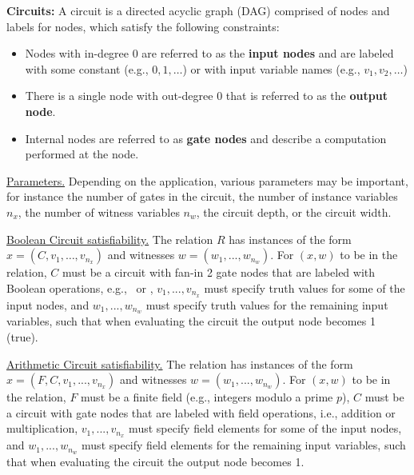 \textbf{Circuits:} A circuit is a directed acyclic graph (DAG) comprised of nodes and labels for nodes, which satisfy the following constraints:
\begin{itemize}
\item Nodes with in-degree 0 are referred to as the \textbf{input nodes} and are labeled with some constant (e.g., $0, 1, \ldots$) or with input variable names (e.g., $v_1, v_2, \ldots$)
\item There is a single node with out-degree 0 that is referred to as the \textbf{output node}.
\item Internal nodes %
are 
referred to as \textbf{gate nodes} and %
describe a computation %
performed at the node.\loosen
\end{itemize}


\underline{Parameters.} Depending on the application, various parameters may be important, for instance the number of gates in the circuit, the number of instance variables $n_x$, the number of witness variables $n_w$, the circuit depth, or the circuit width.
 
\underline{Boolean Circuit satisfiability.} 
	The relation $R$ has instances of the form $x = (C, v_1, \ldots, v_{n_x})$ and witnesses $w = (w_1,...,w_{n_w})$. 
	For $(x,w)$ to be in the relation, $C$ must be a circuit with fan-in 2 gate nodes 
that are labeled with Boolean operations, e.g., \XOR\ or \AND, $v_1,...,v_{n_x}$ must specify 
truth values for some of the input nodes, and $w_1,...,w_{n_w}$ must specify 
truth values for the remaining input variables, such that when evaluating the circuit the output node becomes 1 (true).
 
\underline{Arithmetic Circuit satisfiability.} 
	The relation has instances of the form $x = (F, C, v_1,...,v_{n_x})$ and witnesses $w = (w_1,...,w_{n_w})$.
	For $(x,w)$ to be in the relation, $F$ must be a finite field (e.g., integers modulo a prime $p$), $C$ must be a circuit with gate nodes that are labeled with field operations, i.e., addition or multiplication, $v_1,...,v_{n_x}$ must specify field elements for some of the input nodes, and $w_1,...,w_{n_w}$ must specify field elements for the remaining input variables, such that when evaluating the circuit the output node becomes 1.
 


